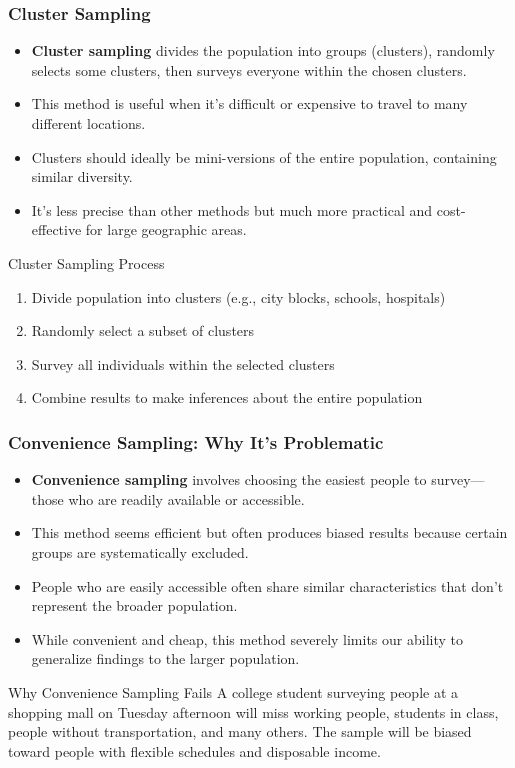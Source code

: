 \documentclass{beamer}
\begin{document}
	\begin{frame}
		\frametitle{Cluster Sampling}
		
		\begin{itemize}
			\item \textbf{Cluster sampling} divides the population into groups (clusters), randomly selects some clusters, then surveys everyone within the chosen clusters.
			\item This method is useful when it's difficult or expensive to travel to many different locations.
			\item Clusters should ideally be mini-versions of the entire population, containing similar diversity.
			\item It's less precise than other methods but much more practical and cost-effective for large geographic areas.
		\end{itemize}
		
		\begin{block}{Cluster Sampling Process}
			\begin{enumerate}
				\item Divide population into clusters (e.g., city blocks, schools, hospitals)
				\item Randomly select a subset of clusters
				\item Survey all individuals within the selected clusters
				\item Combine results to make inferences about the entire population
			\end{enumerate}
		\end{block}
		
	\end{frame}
	
	\begin{frame}
		\frametitle{Convenience Sampling: Why It's Problematic}
		
		\begin{itemize}
			\item \textbf{Convenience sampling} involves choosing the easiest people to survey—those who are readily available or accessible.
			\item This method seems efficient but often produces biased results because certain groups are systematically excluded.
			\item People who are easily accessible often share similar characteristics that don't represent the broader population.
			\item While convenient and cheap, this method severely limits our ability to generalize findings to the larger population.
		\end{itemize}
		
		\begin{alertblock}{Why Convenience Sampling Fails}
			A college student surveying people at a shopping mall on Tuesday afternoon will miss working people, students in class, people without transportation, and many others. The sample will be biased toward people with flexible schedules and disposable income.
		\end{alertblock}
		
	\end{frame}
	
\end{document}
